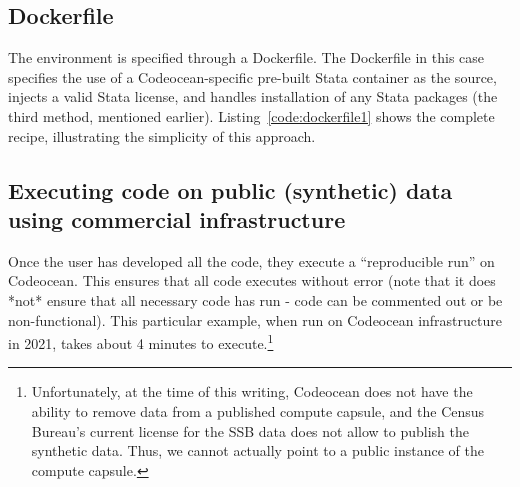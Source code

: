 \documentclass[]{hdsr}
\begin{document}








\subsection{Dockerfile}

The environment is specified through a Dockerfile. The Dockerfile in this case specifies the use of a Codeocean-specific pre-built Stata container as the source, injects a valid Stata license, and handles installation of any Stata packages (the third method, mentioned earlier). Listing~\ref{code:dockerfile1} shows the complete recipe, illustrating the simplicity of this approach. 



\subsection{Executing code on public (synthetic) data using commercial infrastructure}

Once the user has developed all the code, they execute a ``reproducible run'' on Codeocean. This ensures that all code executes without error (note that it does *not* ensure that all necessary code has run - code can be commented out or be non-functional). This particular example, when run on Codeocean infrastructure in 2021, takes about 4 minutes to execute.\footnote{Unfortunately, at the time of this writing, Codeocean does not have the ability to remove data from a published compute capsule, and the Census Bureau's current license for the SSB data does not allow to publish the synthetic data. Thus, we cannot actually point to a public instance of the compute capsule.}
\end{document}
